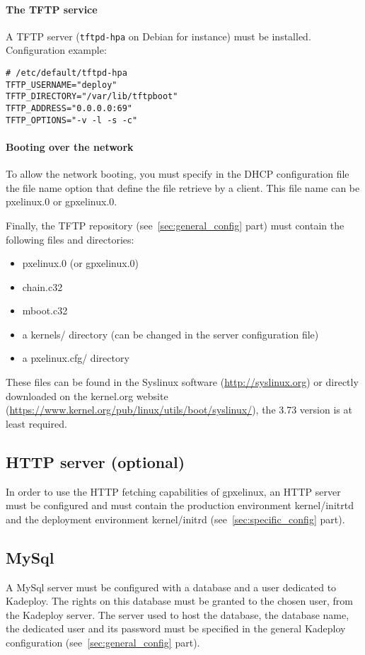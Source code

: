 \documentclass[a4wide,10pt,oneside]{book}
\begin{document}
\paragraph{The TFTP service\\}
A TFTP server (\texttt{tftpd-hpa} on Debian for instance) must be installed. Configuration example:
\begin{verbatim}
# /etc/default/tftpd-hpa
TFTP_USERNAME="deploy"
TFTP_DIRECTORY="/var/lib/tftpboot"
TFTP_ADDRESS="0.0.0.0:69"
TFTP_OPTIONS="-v -l -s -c"
\end{verbatim}

\paragraph{Booting over the network\\}
To allow the network booting, you must specify in the DHCP configuration file the file name option that define the file retrieve by a client. This file name can be pxelinux.0 or gpxelinux.0.

Finally, the TFTP repository (see~\ref{sec:general_config} part) must contain the following files and directories: 
\begin{itemize}
 \item pxelinux.0 (or gpxelinux.0)
 \item chain.c32
 \item mboot.c32
 \item a kernels/ directory (can be changed in the server configuration file) 
 \item a pxelinux.cfg/ directory
\end{itemize} 
These files can be found in the Syslinux software (\url{http://syslinux.org}) or directly downloaded on the kernel.org website (\url{https://www.kernel.org/pub/linux/utils/boot/syslinux/}), the 3.73 version is at least required.

\subsection{HTTP server (optional)}
In order to use the HTTP fetching capabilities of gpxelinux, an HTTP server must be configured and must contain the production environment kernel/initrtd and the deployment environment kernel/initrd (see~\ref{sec:specific_config} part).

\subsection{MySql}
A MySql server must be configured with a database and a user dedicated to Kadeploy. The rights on this database must be granted to the chosen user, from the Kadeploy server. The server used to host the database, the database name, the dedicated user and its password must be specified in the general Kadeploy configuration (see~\ref{sec:general_config} part).
\end{document}
